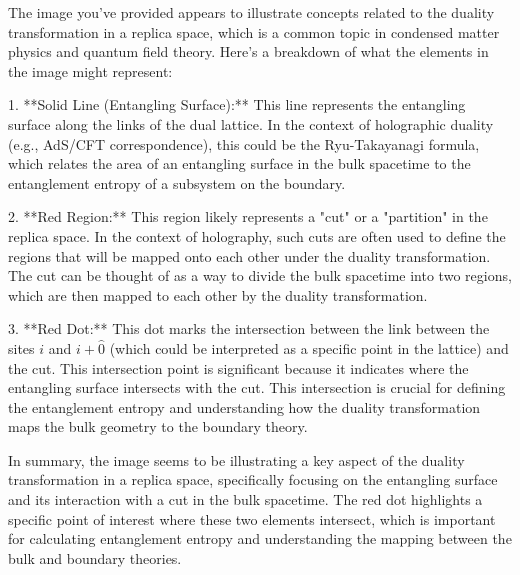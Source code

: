 The image you've provided appears to illustrate concepts related to the duality transformation in a replica space, which is a common topic in condensed matter physics and quantum field theory. Here's a breakdown of what the elements in the image might represent:

1. **Solid Line (Entangling Surface):** This line represents the entangling surface along the links of the dual lattice. In the context of holographic duality (e.g., AdS/CFT correspondence), this could be the Ryu-Takayanagi formula, which relates the area of an entangling surface in the bulk spacetime to the entanglement entropy of a subsystem on the boundary.

2. **Red Region:** This region likely represents a "cut" or a "partition" in the replica space. In the context of holography, such cuts are often used to define the regions that will be mapped onto each other under the duality transformation. The cut can be thought of as a way to divide the bulk spacetime into two regions, which are then mapped to each other by the duality transformation.

3. **Red Dot:** This dot marks the intersection between the link between the sites \( i \) and \( i + \hat{0} \) (which could be interpreted as a specific point in the lattice) and the cut. This intersection point is significant because it indicates where the entangling surface intersects with the cut. This intersection is crucial for defining the entanglement entropy and understanding how the duality transformation maps the bulk geometry to the boundary theory.

In summary, the image seems to be illustrating a key aspect of the duality transformation in a replica space, specifically focusing on the entangling surface and its interaction with a cut in the bulk spacetime. The red dot highlights a specific point of interest where these two elements intersect, which is important for calculating entanglement entropy and understanding the mapping between the bulk and boundary theories.